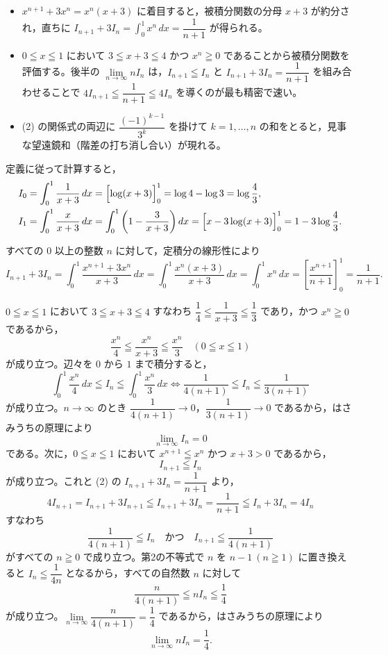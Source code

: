 \begin{itemize}[leftmargin=1.6em,itemsep=2pt,topsep=2pt]
  \item[(2)] $x^{n+1}+3x^{n}=x^{n}(x+3)$ に着目すると，被積分関数の分母 $x+3$ が約分され，直ちに $I_{n+1}+3I_{n}=\int_{0}^{1}x^{n}\,dx=\dfrac{1}{n+1}$ が得られる。
  \item[(3)] $0\leqq x\leqq 1$ において $3\leqq x+3\leqq 4$ かつ $x^{n}\geqq 0$ であることから被積分関数を評価する。後半の $\lim\limits_{n\to\infty}nI_{n}$ は，$I_{n+1}\leqq I_{n}$ と $I_{n+1}+3I_{n}=\dfrac{1}{n+1}$ を組み合わせることで $4I_{n+1}\leqq\dfrac{1}{n+1}\leqq 4I_{n}$ を導くのが最も精密で速い。
  \item[(4)] (2) の関係式の両辺に $\dfrac{(-1)^{k-1}}{3^{k}}$ を掛けて $k=1, \ldots, n$ の和をとると，見事な望遠鏡和（階差の打ち消し合い）が現れる。
\end{itemize}

定義に従って計算すると，
\begin{align*}
  I_{0} &= \int_{0}^{1}\frac{1}{x+3}\,dx = \Bigl[\log(x+3)\Bigr]_{0}^{1} = \log 4 - \log 3 = \log\frac{4}{3},\\
  I_{1} &= \int_{0}^{1}\frac{x}{x+3}\,dx = \int_{0}^{1}\left(1-\frac{3}{x+3}\right)dx = \Bigl[x-3\log(x+3)\Bigr]_{0}^{1} = 1 - 3\log\frac{4}{3}.
\end{align*}


すべての $0$ 以上の整数 $n$ に対して，定積分の線形性により
\[
  I_{n+1} + 3I_{n}
  = \int_{0}^{1}\frac{x^{n+1}+3x^{n}}{x+3}\,dx
  = \int_{0}^{1}\frac{x^{n}(x+3)}{x+3}\,dx
  = \int_{0}^{1}x^{n}\,dx
  = \left[\frac{x^{n+1}}{n+1}\right]_{0}^{1} = \frac{1}{n+1}.
\]


$0\leqq x\leqq 1$ において $3\leqq x+3\leqq 4$ すなわち $\dfrac{1}{4}\leqq\dfrac{1}{x+3}\leqq\dfrac{1}{3}$ であり，かつ $x^{n}\geqq 0$ であるから，
\[
  \frac{x^{n}}{4} \leqq \frac{x^{n}}{x+3} \leqq \frac{x^{n}}{3} \quad (0\leqq x\leqq 1)
\]
が成り立つ。辺々を $0$ から $1$ まで積分すると，
\[
  \int_{0}^{1}\frac{x^{n}}{4}\,dx \leqq I_{n} \leqq \int_{0}^{1}\frac{x^{n}}{3}\,dx
  \iff \frac{1}{4(n+1)} \leqq I_{n} \leqq \frac{1}{3(n+1)}
\]
が成り立つ。$n\to\infty$ のとき $\dfrac{1}{4(n+1)}\to 0$，$\dfrac{1}{3(n+1)}\to 0$ であるから，はさみうちの原理により
\[
  \lim_{n\to\infty}I_{n} = 0
\]
である。次に，$0\leqq x\leqq 1$ において $x^{n+1}\leqq x^{n}$ かつ $x+3>0$ であるから，
\[
  I_{n+1} \leqq I_{n}
\]
が成り立つ。これと (2) の $I_{n+1}+3I_{n}=\dfrac{1}{n+1}$ より，
\[
  4I_{n+1} = I_{n+1}+3I_{n+1} \leqq I_{n+1}+3I_{n} = \frac{1}{n+1} \leqq I_{n}+3I_{n} = 4I_{n}
\]
すなわち
\[
  \frac{1}{4(n+1)} \leqq I_{n} \quad\text{かつ}\quad I_{n+1} \leqq \frac{1}{4(n+1)}
\]
がすべての $n\geqq 0$ で成り立つ。第2の不等式で $n$ を $n-1\ (n\geqq 1)$ に置き換えると $I_{n}\leqq\dfrac{1}{4n}$ となるから，すべての自然数 $n$ に対して
\[
  \frac{n}{4(n+1)} \leqq nI_{n} \leqq \frac{1}{4}
\]
が成り立つ。$\lim\limits_{n\to\infty}\dfrac{n}{4(n+1)}=\dfrac{1}{4}$ であるから，はさみうちの原理により
\[
  \lim_{n\to\infty}nI_{n} = \frac{1}{4}.
\]


